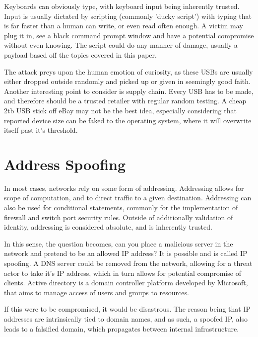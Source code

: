 Keyboards can obviously type, with keyboard input being inherently trusted. Input is usually dictated by scripting (commonly 'ducky script')
with typing that is far faster than a human can write, or even read often enough. A victim may plug it in, see a black command prompt window and have a potential compromise without even knowing. 
The script could do any manner of damage, usually a payload based off the topics covered in this paper. 

The attack preys upon the human emotion of curiosity, as these USBs are usually either dropped outside randomly and picked up or given in seemingly good faith. Another interesting point to consider is supply chain.
Every USB has to be made, and therefore should be a trusted retailer with regular random testing. A cheap 2tb USB stick off eBay may not be the best idea, especially considering that reported device size can be faked to the operating system,
where it will overwrite itself past it's threshold.

\section{Address Spoofing}
In most cases, networks rely on some form of addressing. Addressing allows for scope of computation, and to direct traffic to a given destination. 
Addressing can also be used for conditional statements, commonly for the implementation of firewall and switch port security rules. Outside of additionally validation of identity, addressing
is considered absolute, and is inherently trusted. \citep{IPMACSpoofing}

In this sense, the question becomes, can you place a malicious server in the network and pretend to be an allowed IP address? It is possible and is called IP spoofing. A DNS server could be removed from the network, allowing for a threat actor to take it's IP address, 
which in turn allows for potential compromise of clients. Active directory is a domain controller platform developed by Microsoft, that aims to manage access of users and groups to resources. 

If this were to be compromised, it would be disastrous. The reason being that IP addresses are intrinsically tied to domain names, and as such, a spoofed IP, also leads to a falsified domain,
which propagates between internal infrastructure. \citep{DNSSpoofing}

